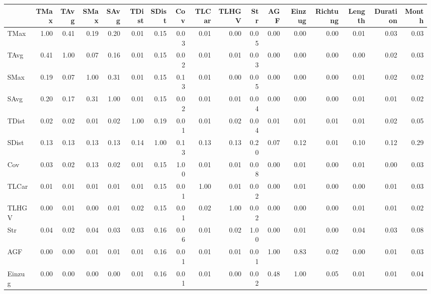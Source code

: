 \begin{tabular}{lrrrrrrrrrrrrrrrr}
\toprule
{} &  TMax &  TAvg &  SMax &  SAvg &  TDist &  SDist &  Cov &  TLCar &  TLHGV &  Str &  AGF &  Einzug &  Richtung &  Length &  Duration &  Month \\
\midrule
TMax     &  1.00 &  0.41 &  0.19 &  0.20 &   0.01 &   0.15 & 0.03 &   0.01 &   0.00 & 0.05 & 0.00 &    0.00 &      0.00 &    0.01 &      0.03 &   0.03 \\
TAvg     &  0.41 &  1.00 &  0.07 &  0.16 &   0.01 &   0.15 & 0.02 &   0.01 &   0.01 & 0.03 & 0.00 &    0.00 &      0.00 &    0.00 &      0.02 &   0.03 \\
SMax     &  0.19 &  0.07 &  1.00 &  0.31 &   0.01 &   0.15 & 0.13 &   0.01 &   0.00 & 0.05 & 0.00 &    0.00 &      0.00 &    0.01 &      0.02 &   0.02 \\
SAvg     &  0.20 &  0.17 &  0.31 &  1.00 &   0.01 &   0.15 & 0.02 &   0.01 &   0.01 & 0.04 & 0.00 &    0.00 &      0.00 &    0.01 &      0.01 &   0.02 \\
TDist    &  0.02 &  0.02 &  0.01 &  0.02 &   1.00 &   0.19 & 0.01 &   0.01 &   0.02 & 0.04 & 0.01 &    0.01 &      0.01 &    0.01 &      0.02 &   0.05 \\
SDist    &  0.13 &  0.13 &  0.13 &  0.13 &   0.14 &   1.00 & 0.13 &   0.13 &   0.13 & 0.20 & 0.07 &    0.12 &      0.01 &    0.10 &      0.12 &   0.29 \\
Cov      &  0.03 &  0.02 &  0.13 &  0.02 &   0.01 &   0.15 & 1.00 &   0.01 &   0.01 & 0.08 & 0.00 &    0.01 &      0.00 &    0.01 &      0.00 &   0.03 \\
TLCar    &  0.01 &  0.01 &  0.01 &  0.01 &   0.01 &   0.15 & 0.01 &   1.00 &   0.01 & 0.02 & 0.00 &    0.01 &      0.00 &    0.00 &      0.01 &   0.03 \\
TLHGV    &  0.00 &  0.01 &  0.00 &  0.01 &   0.02 &   0.15 & 0.01 &   0.02 &   1.00 & 0.02 & 0.00 &    0.00 &      0.00 &    0.01 &      0.01 &   0.02 \\
Str      &  0.04 &  0.02 &  0.04 &  0.03 &   0.03 &   0.16 & 0.06 &   0.01 &   0.02 & 1.00 & 0.00 &    0.01 &      0.00 &    0.04 &      0.03 &   0.08 \\
AGF      &  0.00 &  0.00 &  0.01 &  0.01 &   0.01 &   0.16 & 0.01 &   0.01 &   0.01 & 0.01 & 1.00 &    0.83 &      0.02 &    0.00 &      0.01 &   0.03 \\
Einzug   &  0.00 &  0.00 &  0.00 &  0.00 &   0.01 &   0.16 & 0.01 &   0.01 &   0.00 & 0.02 & 0.48 &    1.00 &      0.05 &    0.01 &      0.01 &   0.04 \\

\end{tabular}

